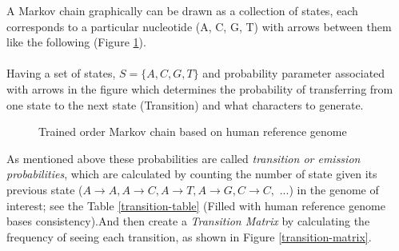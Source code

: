 \documentclass[11pt,a4paper]{report}
\begin{document}
 
A Markov chain graphically can be drawn as a collection of states, 
each corresponds to a particular nucleotide (A, C, G, T) with arrows
between them like the following (Figure \ref{MC}). 
\\\\ 
Having a set of states,  $ S= \{ A, C,  G, T \}$  and probability
parameter  associated with arrows in the figure which determines the
probability of transferring from one state to the next state (Transition)
and what characters to generate.

\begin{figure}
 \begin{center}
  \caption{Trained  order Markov chain based on human reference genome}
  \label{MC}
 \end{center}
\end{figure}





As mentioned above these probabilities are called \emph{transition or emission 
probabilities}, which are calculated by counting the number of state given its 
previous state ($ A \rightarrow A, A\rightarrow C, A \rightarrow T, A \rightarrow 
G, C \rightarrow C,$ ...) in the genome of interest; see the Table \ref{transition-table}
(Filled with human reference genome bases consistency).And then create a 
\emph{Transition Matrix} by calculating the frequency of seeing each transition,
as shown in Figure \ref{transition-matrix}.\\
\end{document}

